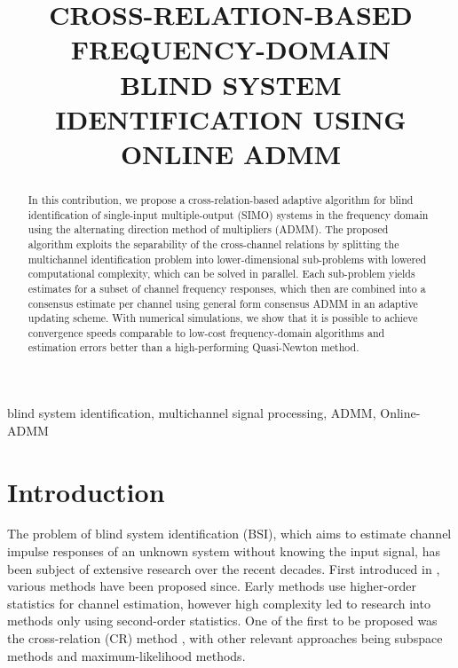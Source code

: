 \documentclass{article}
\title{CROSS-RELATION-BASED FREQUENCY-DOMAIN\\ BLIND SYSTEM IDENTIFICATION USING ONLINE ADMM}
\begin{document}
%
\maketitle
%
\begin{abstract}
    In this contribution, we propose a cross-relation-based adaptive algorithm for blind identification of single-input multiple-output (SIMO) systems in the frequency domain using the alternating direction method of multipliers (ADMM).
    The proposed algorithm exploits the separability of the cross-channel relations by splitting the multichannel identification problem into lower-dimensional sub-problems with lowered computational complexity, which can be solved in parallel.
    Each sub-problem yields estimates for a subset of channel frequency responses, which then are combined into a consensus estimate per channel using general form consensus ADMM in an adaptive updating scheme.
    With numerical simulations, we show that it is possible to achieve convergence speeds comparable to low-cost frequency-domain algorithms and estimation errors better than a high-performing Quasi-Newton method.
\end{abstract}
%
\begin{keywords}
    blind system identification, multichannel signal processing, ADMM, Online-ADMM
\end{keywords}
%
\section{Introduction}
\label{sec:intro}


The problem of blind system identification (BSI), which aims to estimate channel impulse responses of an unknown system without knowing the input signal, has been subject of extensive research over the recent decades.
First introduced in \cite{satoMethodSelfRecoveringEqualization1975}, various methods have been proposed since.
Early methods use higher-order statistics \cite{godardSelfRecoveringEqualizationCarrier1980,tongNewApproachBlind1991,mecidel1991tutorial} for channel estimation, however high complexity led to research into methods only using second-order statistics.
One of the first to be proposed was the cross-relation (CR) method \cite{tong1994blind, guanghanxuLeastsquaresApproachBlind1995}, with other relevant approaches being subspace methods \cite{moulinesSubspaceMethodsBlind1995,gannotSubspaceMethodsMultimicrophone2003,diamantarasEfficientSubspaceMethod2008,mayyalaStructureBasedSubspaceMethod2017} and maximum-likelihood \cite{yingbohuaFastMaximumLikelihood1996} methods.
\end{document}

